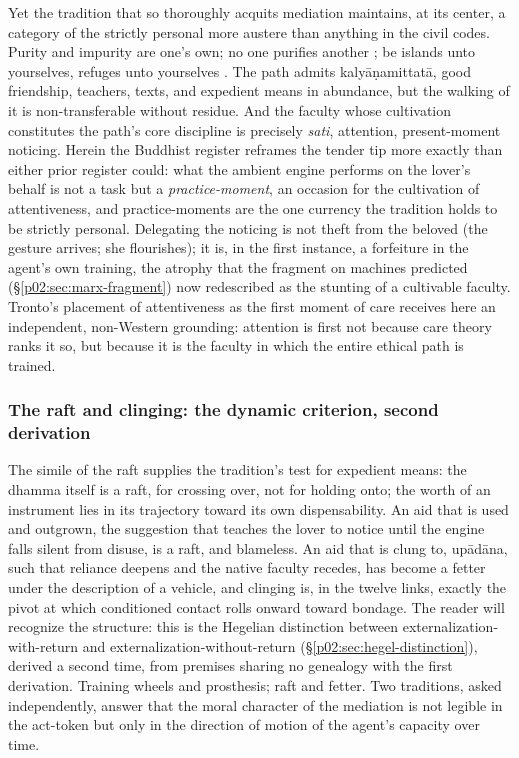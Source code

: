 Yet the tradition that so thoroughly acquits mediation maintains, at its center, a category of the strictly personal more austere than anything in the civil codes. Purity and impurity are one's own; no one purifies another \parencite[v.~165]{buddharakkhita1985dhammapada}; be islands unto yourselves, refuges unto yourselves \parencite[DN 16]{walshe1995long}. The path admits kaly\=a\d{n}amittat\=a, good friendship, teachers, texts, and expedient means in abundance, but the walking of it is non-transferable without residue. And the faculty whose cultivation constitutes the path's core discipline is precisely \emph{sati}, attention, present-moment noticing. Herein the Buddhist register reframes the tender tip more exactly than either prior register could: what the ambient engine performs on the lover's behalf is not a task but a \emph{practice-moment}, an occasion for the cultivation of attentiveness, and practice-moments are the one currency the tradition holds to be strictly personal. Delegating the noticing is not theft from the beloved (the gesture arrives; she flourishes); it is, in the first instance, a forfeiture in the agent's own training, the atrophy that the fragment on machines predicted (\S\ref{p02:sec:marx-fragment}) now redescribed as the stunting of a cultivable faculty. Tronto's placement of attentiveness as the first moment of care \parencite{tronto1993moral} receives here an independent, non-Western grounding: attention is first not because care theory ranks it so, but because it is the faculty in which the entire ethical path is trained.

\subsubsection{The raft and clinging: the dynamic criterion, second derivation}
\label{p02:sec:buddhism-raft}

The simile of the raft \parencite[MN 22]{nanamoli1995middle} supplies the tradition's test for expedient means: the dhamma itself is a raft, for crossing over, not for holding onto; the worth of an instrument lies in its trajectory toward its own dispensability. An aid that is used and outgrown, the suggestion that teaches the lover to notice until the engine falls silent from disuse, is a raft, and blameless. An aid that is clung to, up\=ad\=ana, such that reliance deepens and the native faculty recedes, has become a fetter under the description of a vehicle, and clinging is, in the twelve links, exactly the pivot at which conditioned contact rolls onward toward bondage. The reader will recognize the structure: this is the Hegelian distinction between externalization-with-return and externalization-without-return (\S\ref{p02:sec:hegel-distinction}), derived a second time, from premises sharing no genealogy with the first derivation. Training wheels and prosthesis; raft and fetter. Two traditions, asked independently, answer that the moral character of the mediation is not legible in the act-token but only in the direction of motion of the agent's capacity over time.

